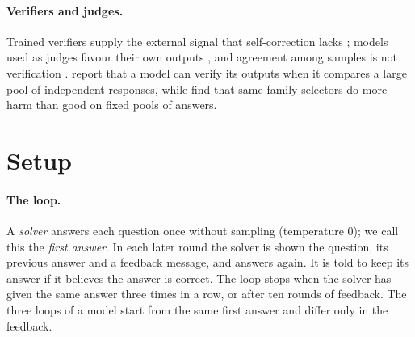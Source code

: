 \documentclass[11pt]{article}
\begin{document}
\paragraph{Verifiers and judges.}
Trained verifiers supply the external signal that self-correction lacks \citep{lightman2024verify}; models used as judges favour their own outputs \citep{zheng2023judging,panickssery2024evaluators}, and agreement among samples is not verification \citep{denisov2026consensus}.
\citet{zhao2025sample} report that a model can verify its outputs when it compares a large pool of independent responses, while \citet{hu2026oracle} find that same-family selectors do more harm than good on fixed pools of answers.

\section{Setup}
\label{sec:setup}

\paragraph{The loop.}
A \emph{solver} answers each question once without sampling (temperature 0); we call this the \emph{first answer}.
In each later round the solver is shown the question, its previous answer and a feedback message, and answers again.
It is told to keep its answer if it believes the answer is correct.
The loop stops when the solver has given the same answer three times in a row, or after ten rounds of feedback.
The three loops of a model start from the same first answer and differ only in the feedback.
\end{document}
